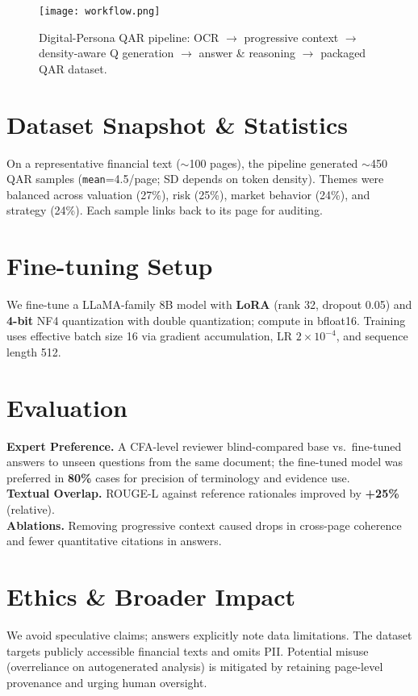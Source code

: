 \documentclass[sigconf,authordraft,anonymous]{acmart}
\begin{document}
\begin{figure}[t]
  \centering
  \texttt{[image: workflow.png]}
  \caption{Digital-Persona QAR pipeline: OCR $\rightarrow$ progressive context $\rightarrow$ density-aware Q generation $\rightarrow$ answer \& reasoning $\rightarrow$ packaged QAR dataset.}
  \label{fig:workflow}
\end{figure}

\section{Dataset Snapshot \& Statistics}
On a representative financial text ($\sim$100 pages), the pipeline generated $\sim$450 QAR samples (\texttt{mean}=4.5/page; SD depends on token density). Themes were balanced across valuation (27\%), risk (25\%), market behavior (24\%), and strategy (24\%). Each sample links back to its page for auditing.

\section{Fine-tuning Setup}
We fine-tune a LLaMA-family 8B model with \textbf{LoRA} (rank 32, dropout 0.05) and \textbf{4-bit} NF4 quantization with double quantization; compute in bfloat16. Training uses effective batch size 16 via gradient accumulation, LR $2\!\times\!10^{-4}$, and sequence length 512.

\section{Evaluation}
\textbf{Expert Preference.} A CFA-level reviewer blind-compared base vs.\ fine-tuned answers to unseen questions from the same document; the fine-tuned model was preferred in \textbf{80\%} cases for precision of terminology and evidence use.\\
\textbf{Textual Overlap.} ROUGE-L against reference rationales improved by \textbf{+25\%} (relative).\\
\textbf{Ablations.} Removing progressive context caused drops in cross-page coherence and fewer quantitative citations in answers.

\section{Ethics \& Broader Impact}
We avoid speculative claims; answers explicitly note data limitations. The dataset targets publicly accessible financial texts and omits PII. Potential misuse (overreliance on autogenerated analysis) is mitigated by retaining page-level provenance and urging human oversight.
\end{document}
